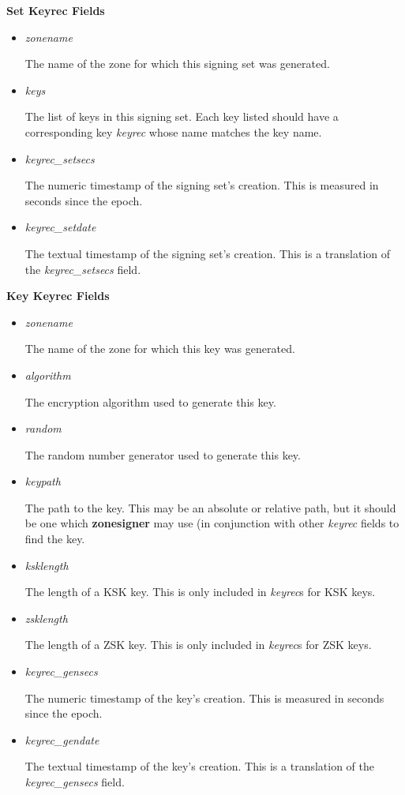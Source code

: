 {\bf Set Keyrec Fields}

\begin{itemize}

\item {\it zonename}

The name of the zone for which this signing set was generated.

\item {\it keys}

The list of keys in this signing set.  Each key listed should have a
corresponding key {\it keyrec} whose name matches the key name.

\item {\it keyrec\_setsecs}

The numeric timestamp of the signing set's creation.
This is measured in seconds since the epoch.

\item {\it keyrec\_setdate}

The textual timestamp of the signing set's creation.
This is a translation of the {\it keyrec\_setsecs} field.

\end{itemize}

{\bf Key Keyrec Fields}

\begin{itemize}

\item {\it zonename}

The name of the zone for which this key was generated.

\item {\it algorithm}

The encryption algorithm used to generate this key.

\item {\it random}

The random number generator used to generate this key.

\item {\it keypath}

The path to the key.  This may be an absolute or relative path, but it should
be one which {\bf zonesigner} may use (in conjunction with other {\it keyrec}
fields to find the key.

\item {\it ksklength}

The length of a KSK key.  This is only included in {\it keyrec}s for KSK keys.

\item {\it zsklength}

The length of a ZSK key.  This is only included in {\it keyrec}s for ZSK keys.

\item {\it keyrec\_gensecs}

The numeric timestamp of the key's creation.  This is measured in seconds
since the epoch.

\item {\it keyrec\_gendate}

The textual timestamp of the key's creation.  This is a translation of
the {\it keyrec\_gensecs} field.

\end{itemize}

